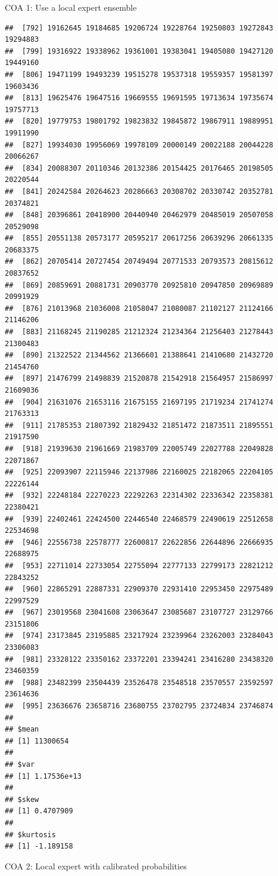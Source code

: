 \documentclass[ignorenonframetext,]{beamer}
\begin{document}
\begin{frame}[fragile]{COA 1: Use a local expert ensemble}
\begin{verbatim}
##  [792] 19162645 19184685 19206724 19228764 19250803 19272843 19294883
##  [799] 19316922 19338962 19361001 19383041 19405080 19427120 19449160
##  [806] 19471199 19493239 19515278 19537318 19559357 19581397 19603436
##  [813] 19625476 19647516 19669555 19691595 19713634 19735674 19757713
##  [820] 19779753 19801792 19823832 19845872 19867911 19889951 19911990
##  [827] 19934030 19956069 19978109 20000149 20022188 20044228 20066267
##  [834] 20088307 20110346 20132386 20154425 20176465 20198505 20220544
##  [841] 20242584 20264623 20286663 20308702 20330742 20352781 20374821
##  [848] 20396861 20418900 20440940 20462979 20485019 20507058 20529098
##  [855] 20551138 20573177 20595217 20617256 20639296 20661335 20683375
##  [862] 20705414 20727454 20749494 20771533 20793573 20815612 20837652
##  [869] 20859691 20881731 20903770 20925810 20947850 20969889 20991929
##  [876] 21013968 21036008 21058047 21080087 21102127 21124166 21146206
##  [883] 21168245 21190285 21212324 21234364 21256403 21278443 21300483
##  [890] 21322522 21344562 21366601 21388641 21410680 21432720 21454760
##  [897] 21476799 21498839 21520878 21542918 21564957 21586997 21609036
##  [904] 21631076 21653116 21675155 21697195 21719234 21741274 21763313
##  [911] 21785353 21807392 21829432 21851472 21873511 21895551 21917590
##  [918] 21939630 21961669 21983709 22005749 22027788 22049828 22071867
##  [925] 22093907 22115946 22137986 22160025 22182065 22204105 22226144
##  [932] 22248184 22270223 22292263 22314302 22336342 22358381 22380421
##  [939] 22402461 22424500 22446540 22468579 22490619 22512658 22534698
##  [946] 22556738 22578777 22600817 22622856 22644896 22666935 22688975
##  [953] 22711014 22733054 22755094 22777133 22799173 22821212 22843252
##  [960] 22865291 22887331 22909370 22931410 22953450 22975489 22997529
##  [967] 23019568 23041608 23063647 23085687 23107727 23129766 23151806
##  [974] 23173845 23195885 23217924 23239964 23262003 23284043 23306083
##  [981] 23328122 23350162 23372201 23394241 23416280 23438320 23460359
##  [988] 23482399 23504439 23526478 23548518 23570557 23592597 23614636
##  [995] 23636676 23658716 23680755 23702795 23724834 23746874
## 
## $mean
## [1] 11300654
## 
## $var
## [1] 1.17536e+13
## 
## $skew
## [1] 0.4707909
## 
## $kurtosis
## [1] -1.189158
\end{verbatim}

\end{frame}

\begin{frame}{COA 2: Local expert with calibrated probabilities}

\end{frame}
\end{document}

